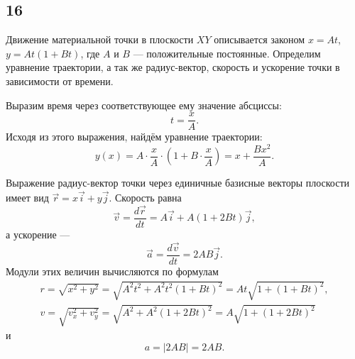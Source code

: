 \subsection{16}

Движение материальной точки в плоскости $XY$ описывается законом $x=At$, $y=At(1+Bt)$, где $A$ и $B$ --- положительные постоянные. Определим уравнение траектории, а так же радиус-вектор, скорость и ускорение точки в зависимости от времени.

Выразим время через соответствующее ему значение абсциссы:
\[
t=\frac{x}{A}.
\]
Исходя из этого выражения, найдём уравнение траектории:
\[
y(x)=A\cdot\frac{x}{A}\cdot\left(1+B\cdot\frac{x}{A}\right)=x+\frac{Bx^2}{A}.
\]

Выражение радиус-вектор точки через единичные базисные векторы плоскости имеет вид $\vec r=x\vec i+y\vec j$. Скорость равна
\[
\vec v=\frac{d\vec r}{dt}=A\vec i+A(1+2Bt)\vec j,
\]
а ускорение ---
\[
\vec a=\frac{d\vec v}{dt}=2AB\vec j.
\]
Модули этих величин вычисляются по формулам
\begin{gather*}
r=\sqrt{x^2+y^2}=\sqrt{A^2t^2+A^2t^2(1+Bt)^2}=At\sqrt{1+(1+Bt)^2}, \\
v=\sqrt{v_x^2+v_y^2}=\sqrt{A^2+A^2(1+2Bt)^2}=A\sqrt{1+(1+2Bt)^2}
\end{gather*}
и
\[
a=|2AB|=2AB.
\]